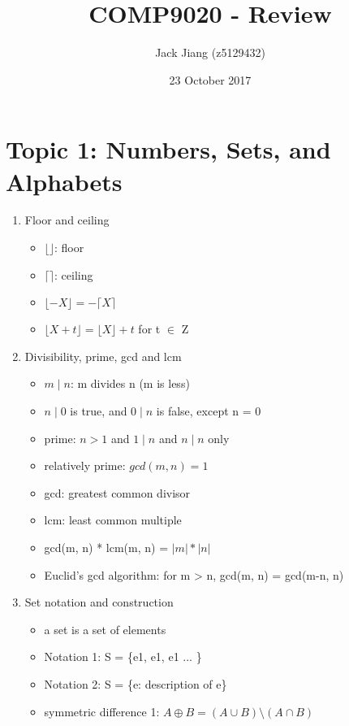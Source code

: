 \documentclass[11pt, a4paper]{article}
\begin{document}
\title{COMP9020 - Review}
\author{Jack Jiang (z5129432)}
\date{ 23 October 2017 }
\maketitle
\graphicspath{{/}}

\section*{Topic 1: Numbers, Sets, and Alphabets}
\begin{enumerate}
    \item Floor and ceiling
        \begin{itemize}
            \item $\lfloor \rfloor$: floor
            \item $\lceil \rceil$: ceiling
            \item $\lfloor -X \rfloor = - \lceil X \rceil$
            \item $\lfloor X + t \rfloor = \lfloor X \rfloor + t$ for t $\in$ Z
        \end{itemize}
    \item Divisibility, prime, gcd and lcm
        \begin{itemize}
            \item $m \mid n$: m divides n (m is less)
            \item $n \mid 0$ is true, and $0 \mid n$ is false, except n = 0
            \item prime: $n > 1$ and $1 \mid n$ and $n \mid n$ only
            \item relatively prime: $gcd(m, n) = 1$
            \item gcd: greatest common divisor
            \item lcm: least common multiple
            \item gcd(m, n) * lcm(m, n) = $|m| * |n|$
            \item Euclid's gcd algorithm: for m > n, gcd(m, n) = gcd(m-n, n)
        \end{itemize}
    \item Set notation and construction
        \begin{itemize}
            \item a set is a set of elements
            \item Notation 1: S = \{e1, e1, e1 ... \}
            \item Notation 2: S = \{e: description of e\}
            \item symmetric difference 1: $A \oplus B = (A \cup B) \setminus (A \cap B)$

\end{itemize}
\end{enumerate}
\end{document}
